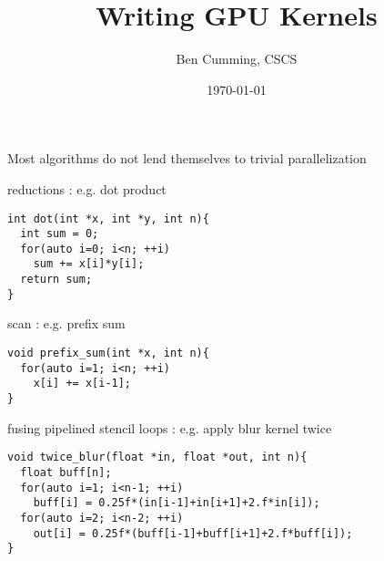 \documentclass[aspectratio=43]{beamer}
\author{Ben Cumming, CSCS}
\title{Writing GPU Kernels}
\subtitle{}
\date{\today}
\begin{document}
\cscstitle


\begin{frame}[fragile]{}
    \centering
    Most algorithms do not lend themselves to trivial parallelization

    \begin{code}{reductions : e.g. dot product}
        \begin{lstlisting}[style=boxcudatiny]
int dot(int *x, int *y, int n){
  int sum = 0;
  for(auto i=0; i<n; ++i)
    sum += x[i]*y[i];
  return sum;
}
        \end{lstlisting}
    \end{code}
\vspace{-7pt}
        \begin{code}{scan : e.g. prefix sum}
            \begin{lstlisting}[style=boxcudatiny]
void prefix_sum(int *x, int n){
  for(auto i=1; i<n; ++i)
    x[i] += x[i-1];
}
        \end{lstlisting}
    \end{code}
\vspace{-7pt}
    \begin{code}{fusing pipelined stencil loops : e.g. apply blur kernel twice}
        \begin{lstlisting}[style=boxcudatiny]
void twice_blur(float *in, float *out, int n){
  float buff[n];
  for(auto i=1; i<n-1; ++i)
    buff[i] = 0.25f*(in[i-1]+in[i+1]+2.f*in[i]);
  for(auto i=2; i<n-2; ++i)
    out[i] = 0.25f*(buff[i-1]+buff[i+1]+2.f*buff[i]);
}
        \end{lstlisting}
    \end{code}

\end{frame}
\end{document}
